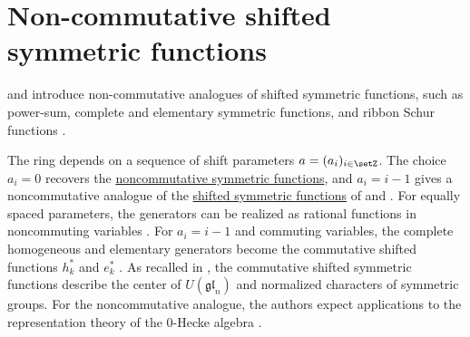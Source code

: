 

\section[nonCommutativeShiftedSymmetricFunctions]{Non-commutative shifted symmetric functions}

 and  introduce
non-commutative analogues of shifted symmetric functions, such as power-sum,
complete and elementary symmetric functions, and ribbon Schur functions
\cite{LaugwitzRetakh2020}.

The ring depends on a sequence of shift parameters $a=(a_i)_{i\in\setZ}$.
The choice $a_i=0$ recovers the
\hyperref[nonComFunctions]{noncommutative symmetric functions}, and
$a_i=i-1$ gives a noncommutative analogue of the
\hyperref[schurShifted]{shifted symmetric functions} of
 and 
\cite[Ex.~2 and Ex.~5]{LaugwitzRetakh2020}.
For equally spaced parameters, the generators can be realized as rational
functions in noncommuting variables \cite[Thm.~51]{LaugwitzRetakh2020}.
For $a_i=i-1$ and commuting variables, the complete homogeneous and
elementary generators become the commutative shifted functions
$h^*_k$ and $e^*_k$ \cite[Prop.~56]{LaugwitzRetakh2020}.
As recalled in \cite[Sect.~1]{LaugwitzRetakh2020}, the commutative shifted
symmetric functions describe the center of $U(\mathfrak{gl}_n)$ and
normalized characters of symmetric groups.
For the noncommutative analogue, the authors expect applications to the
representation theory of the $0$-Hecke algebra
\cite[Sect.~1.5]{LaugwitzRetakh2020}.

